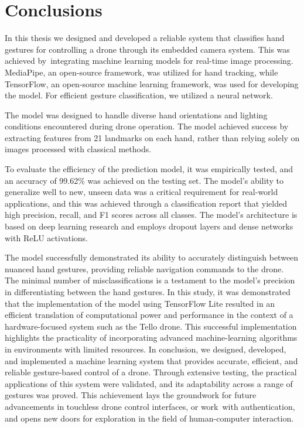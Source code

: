 \chapter{Conclusions}
In this thesis we designed and developed
 a reliable system that classifies hand gestures for controlling a drone through
 its embedded camera system.
  This was achieved by~integrating machine learning models for real-time image processing. MediaPipe, an open-source framework, was utilized for hand tracking, while TensorFlow, an open-source machine learning framework, was used for developing the model. 
  For efficient gesture classification, we utilized a neural network.
  
   The model was designed to handle diverse hand orientations and lighting conditions encountered during drone operation. 
 The model achieved success by extracting features from 21 landmarks on each hand, rather than relying solely on images processed with classical methods. 

To evaluate the efficiency of the prediction model, it was empirically tested, and an accuracy of 99.62\% was achieved on the testing set. The model's ability to generalize well to new, unseen data was a critical requirement for real-world applications, and this was achieved through a classification report that yielded high precision, recall, and F1 scores across all classes. The model's architecture is based on deep learning research and employs dropout layers and dense networks with ReLU activations.

The model successfully demonstrated its ability to accurately distinguish between nuanced hand gestures, providing reliable navigation commands to the drone. The minimal number of misclassifications is a testament to the model's precision in differentiating between the hand gestures.
In this study, it was demonstrated that the implementation of the model using TensorFlow Lite resulted in an efficient translation of computational power and performance in the context of a hardware-focused system such as the Tello drone. This successful implementation highlights the practicality of incorporating advanced machine-learning algorithms in environments with limited resources. 
In conclusion, we designed, developed, and implemented a machine learning system that provides accurate, efficient, and reliable gesture-based control of a drone.
 Through extensive testing, the practical applications of this system were validated, and its adaptability across a range of gestures was proved. This achievement lays the groundwork for future advancements in touchless drone control interfaces, or work~with authentication, and opens new doors for exploration in the field of human-computer interaction.
